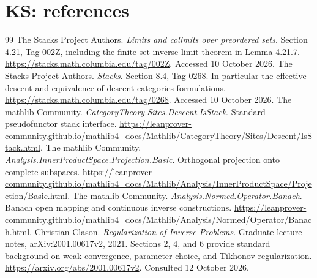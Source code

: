 \documentclass[11pt,oneside,openany]{book}
\numberwithin{equation}{section}
\begin{document}
\chapter{KS: references}
\begin{thebibliography}{99}
 The Stacks Project Authors. \emph{Limits and colimits over preordered sets}. Section 4.21, Tag 002Z, including the finite-set inverse-limit theorem in Lemma 4.21.7. \url{https://stacks.math.columbia.edu/tag/002Z}. Accessed 10 October 2026.
 The Stacks Project Authors. \emph{Stacks}. Section 8.4, Tag 0268. In particular the effective descent and equivalence-of-descent-categories formulations. \url{https://stacks.math.columbia.edu/tag/0268}. Accessed 10 October 2026.
 The mathlib Community. \emph{CategoryTheory.Sites.Descent.IsStack}. Standard pseudofunctor stack interface. \url{https://leanprover-community.github.io/mathlib4_docs/Mathlib/CategoryTheory/Sites/Descent/IsStack.html}.
 The mathlib Community. \emph{Analysis.InnerProductSpace.Projection.Basic}. Orthogonal projection onto complete subspaces. \url{https://leanprover-community.github.io/mathlib4_docs/Mathlib/Analysis/InnerProductSpace/Projection/Basic.html}.
 The mathlib Community. \emph{Analysis.Normed.Operator.Banach}. Banach open mapping and continuous inverse constructions. \url{https://leanprover-community.github.io/mathlib4_docs/Mathlib/Analysis/Normed/Operator/Banach.html}.
 Christian Clason. \emph{Regularization of Inverse Problems}. Graduate lecture notes, arXiv:2001.00617v2, 2021. Sections 2, 4, and 6 provide standard background on weak convergence, parameter choice, and Tikhonov regularization. \url{https://arxiv.org/abs/2001.00617v2}. Consulted 12 October 2026.
\end{thebibliography}
\end{document}
